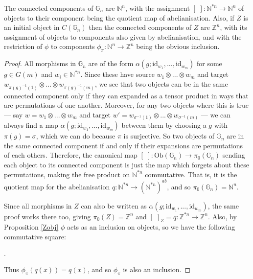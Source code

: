 \documentclass{amsart} %
\newenvironment{eq*}{\begin{equation*}}{\end{equation*}}
\begin{document}
\begin{prop}\label{concomp} The connected components of $\mathbb{G}_n$ are $\mathbb{N}^n$, with the assignment $[ \,\, ] : \mathbb{N}^{*n} \to \mathbb{N}^n$ of objects to their component being the quotient map of abelianisation. Also, if $Z$ is an initial object in $C(\mathbb{G}_n)$ then the connected components of $Z$ are $\mathbb{Z}^n$, with its assignment of objects to components also given by abelianisation, and with the restriction of $\phi$ to components $\phi_\pi : \mathbb{N}^n \to \mathbb{Z}^n$ being the obvious inclusion. 
\end{prop}
\begin{proof}All morphisms in $\mathbb{G}_n$ are of the form $\alpha(g; \mathrm{id}_{w_1}, ..., \mathrm{id}_{w_m})$ for some $g \in G(m)$ and $w_i \in \mathbb{N}^{*n}$. Since these have source $w_1 \otimes ... \otimes w_m$ and target $w_{\pi(g)^{-1}(1)} \otimes ... \otimes w_{\pi(g)^{-1}(m)}$, we see that two objects can be in the same connected component only if they can expanded as a tensor product in ways that are permutations of one another. Moreover, for any two objects where this is true --- say $w = w_1 \otimes ... \otimes w_m$ and target $w' = w_{\sigma^{-1}(1)} \otimes ... \otimes w_{\sigma^{-1}(m)}$ --- we can always find a map $\alpha(g; \mathrm{id}_{w_1}, ..., \mathrm{id}_{w_m})$  between them by choosing a $g$ with $\pi(g) = \sigma$, which we can do because $\pi$ is surjective. So two objects of $\mathbb{G}_n$ are in the same connected component if and only if their expansions are permutations of each others. Therefore, the canonical map $[ \,\, ] : \mathrm{Ob}(\mathbb{G}_n) \to \pi_0(\mathbb{G}_n)$ sending each object to its connected component is just the map which forgets about these permutations, making the free product on $\mathbb{N}^{*n}$ commutative. That is, it is the quotient map for the abelianisation $q : \mathbb{N}^{*n} \to (\mathbb{N}^{*n})^{ab}$, and so $\pi_0(\mathbb{G}_n) = \mathbb{N}^n$. 

Since all morphisms in $Z$ can also be written as $\alpha(g; \mathrm{id}_{w_1}, ..., \mathrm{id}_{w_m})$, the same proof works there too, giving $\pi_0(Z) = \mathbb{Z}^n$ and $[ \,\, ]_Z = q : \mathbb{Z}^{*n} \to \mathbb{Z}^n$. Also, by Proposition \ref{Zobj} $\phi$ acts as an inclusion on objects, so we have the following commutative square:
\begin{eq*} .
\end{eq*}
Thus $\phi_\pi(q(x)) = q(x)$, and so $\phi_\pi$ is also an inclusion.
\end{proof}
\end{document}
